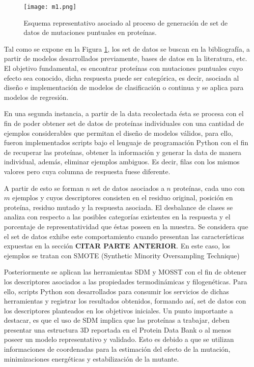 \begin{figure}[!h]
	\centering
	\texttt{[image: m1.png]}
	\caption{Esquema representativo asociado al proceso de generación de set de datos de mutaciones puntuales en proteínas.}
	\label{C2:M1}
\end{figure}

Tal como se expone en la Figura \ref{C2:M1}, los set de datos se buscan en la bibliografía, a partir de modelos desarrollados previamente, bases de datos en la literatura, etc. El objetivo fundamental, es encontrar proteínas con mutaciones puntuales cuyo efecto sea conocido, dicha respuesta puede ser categórica, es decir, asociada al diseño e implementación de modelos de clasificación o continua y se aplica para modelos de regresión. 

En una segunda instancia, a partir de la data recolectada ésta se procesa con el fin de poder obtener set de datos de proteínas individuales con una cantidad de ejemplos considerables que permitan el diseño de modelos válidos, para ello, fueron implementados scripts bajo el lenguaje de programación Python con el fin de recuperar las proteínas, obtener la información y generar la data de manera individual, además, eliminar ejemplos ambiguos. Es decir, filas con los mismos valores pero cuya columna de respuesta fuese diferente. 

A partir de esto se forman $n$ set de datos asociados a $n$ proteínas, cada uno con $m$ ejemplos y cuyos descriptores consisten en el residuo original, posición en proteína, residuo mutado y la respuesta asociada. El desbalance de clases se analiza con respecto a las posibles categorías existentes en la respuesta y el porcentaje de representatividad que éstas poseen en la muestra. Se considera que el set de datos exhibe este comportamiento cuando presentan las características expuestas en la sección \textbf{CITAR PARTE ANTERIOR}. En este caso, los ejemplos se tratan con SMOTE (Synthetic Minority Oversampling Technique) \cite{chawla2002smote}

Posteriormente se aplican las herramientas SDM \cite{Pandurangan2017} y MOSST \cite{Olivera-Nappa2011} con el fin de obtener los descriptores asociados a las propiedades termodinámicas y filogenéticas. Para ello, scripts Python son desarrollados para consumir los servicios de dichas herramientas y registrar los resultados obtenidos, formando así, set de datos con los descriptores planteados en los objetivos iniciales. Un punto importante a destacar, es que el uso de SDM implica que las proteínas a trabajar, deben presentar una estructura 3D reportada en el Protein Data Bank \cite{berman2000protein} o al menos poseer un modelo representativo y validado. Esto es debido a que se utilizan informaciones de coordenadas para la estimación del efecto de la mutación, minimizaciones energéticas y estabilización de la mutante.

